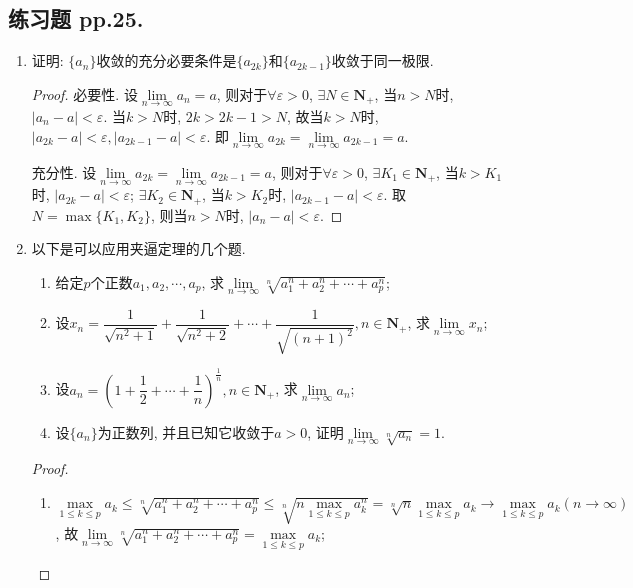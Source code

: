 \documentclass[a4paper,11pt,twoside]{ctexbook}
\begin{document}
\subsection{练习题 pp.25.}
\begin{enumerate}
	\item	证明: $\{a_n\}$收敛的充分必要条件是$\{a_{2k}\}$和$\{a_{2k-1}\}$收敛于同一极限.
	      \begin{proof}
		      必要性. 设$\lim\limits_{n\to\infty} a_n=a$, 则对于$\forall\varepsilon>0$, $\exists N\in\mathbf{N}_{+}$, 当$n>N$时, $|a_n-a|<\varepsilon$. 当$k>N$时, $2k>2k-1>N$, 故当$k>N$时, $|a_{2k}-a|<\varepsilon, |a_{2k-1}-a|<\varepsilon$. 即$\lim\limits_{n\to\infty} a_{2k}=\lim\limits_{n\to\infty} a_{2k-1}=a$.

		      充分性. 设$\lim\limits_{n\to\infty} a_{2k}=\lim\limits_{n\to\infty} a_{2k-1}=a$, 则对于$\forall\varepsilon>0$, $\exists K_1\in\mathbf{N}_{+}$, 当$k>K_1$时, $|a_{2k}-a|<\varepsilon$; $\exists K_2\in\mathbf{N}_{+}$, 当$k>K_2$时, $|a_{2k-1}-a|<\varepsilon$. 取$N=\max\{K_1,K_2\}$, 则当$n>N$时, $|a_n-a|<\varepsilon$.\qedhere
	      \end{proof}
	\item 以下是可以应用夹逼定理的几个题.
	      \begin{enumerate}[(1)]
		      \item 给定$p$个正数$a_1,a_2,\cdots,a_p$, 求$\lim\limits_{n\to\infty} \sqrt[n]{a_1^n+a_2^n+\cdots+a_p^n}$;
		      \item 设$x_n=\dfrac{1}{\sqrt{n^2+1}}+\dfrac{1}{\sqrt{n^2+2}}+\cdots+\dfrac{1}{\sqrt{(n+1)^2}}, n\in\mathbf{N}_{+}$, 求$\lim\limits_{n\to\infty} x_n$;
		      \item 设$a_n=\left(1+\dfrac{1}{2}+\cdots+\dfrac{1}{n}\right)^\frac{1}{n}, n\in\mathbf{N}_{+}$, 求$\lim\limits_{n\to\infty} a_n$;
		      \item 设$\{a_n\}$为正数列, 并且已知它收敛于$a>0$, 证明$\lim\limits_{n\to\infty} \sqrt[n]{a_n}=1$.
	      \end{enumerate}
	      \begin{proof}
		      \begin{enumerate}[(1)]
			      \item $\max\limits_{1\leqslant k\leqslant p} a_k\leqslant\sqrt[n]{a_1^n+a_2^n+\cdots+a_p^n}\leqslant\sqrt[n]{n\max\limits_{1\leqslant k\leqslant p} a_k^n}=\sqrt[n]{n}\max\limits_{1\leqslant k\leqslant p} a_k\to\max\limits_{1\leqslant k\leqslant p} a_k (n\to\infty)$, 故$\lim\limits_{n\to\infty} \sqrt[n]{a_1^n+a_2^n+\cdots+a_p^n}=\max\limits_{1\leqslant k\leqslant p} a_k$;

\end{enumerate}
\end{proof}
\end{enumerate}
\end{document}

